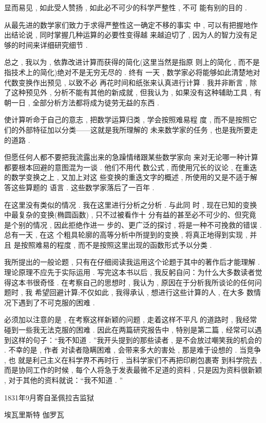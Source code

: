 显而易见 , 如此受人赞扬 , 如此必不可少的科学严整性 , 不可 能有别的目的 . 

从最先进的数学家们致力于求得严整性这一确定不移的事实 中 , 可以有把握地作出结论说 , 同时掌握几种运算的必要性变得越 来越迫切了 , 因为人的智力没有足够的时间来详细研究细节 . 

总之 , 我以为 , 依靠改进计算而获得的简化(这里当然是指原 则上的简化 , 而不是指技术上的简化)绝对不是无穷无尽的 . 终有 一天 , 数学家必将能够如此清楚地对代数变换作出预见 , 以致不必 再花时间和纸张来认真进行计算 . 我并非断言 , 除了这种预见外 ,  分析不能有其他的新成就 , 但我认为 , 如果没有这种辅助工具 , 有 朝一日 , 全部分析方法都将成为徒劳无益的东西 . 

使计算听命于自己的意志 , 把数学运算归类 , 学会按照难易程 度 , 而不是按照它们的外部特征加以分类——这就是我所理解的 未来数学家的任务 , 也是我所要走的道路 . 

但愿任何人都不要把我流露出来的急躁情绪跟某些数学家向 来对无论哪一种计算都要根本回避的意图混为一谈 . 他们不用代 数公式 , 而使用冗长的议论 , 在重迭的数学变换之上 , 又加上对这 些变换的重迭文字的概述 , 所使用的又是不适于解答这些算题的 语言 . 这些数学家落后了一百年 . 

在这里没有类似的情况 . 我在这里进行分析之分析 . 与此同 时 , 现在已知的变换中最复杂的变换(椭圆函数) , 只不过被看作十 分有益的甚至必不可少的、但究竟是个别的情况 , 因此拒绝作进一 步的、更广泛的探讨 , 将是一种不可挽救的错误 . 总有一天 , 在这 个粗具轮廓的高等分析中所提到的变换 , 将真正地得到实现 , 并且 是按照难易的程度 , 而不是按照这里出现的函数形式予以分类 . 

我所提出的一般论题 , 只有在仔细阅读我运用这个论题于其中的著作后才能理解 . 理论原理不应先于实际运用 . 写完这本书以后 , 我反躬自问：为什么大多数读者觉得这本书很奇怪 . 在考察自己的思想时 , 我认为 , 原因在于分析我所谈论的任何问题时 , 我 希望回避计算;不仅如此 , 我得承认 , 想进行这些计算的人 , 在大多 数情况下遇到了不可克服的困难 . 

必须加以注意的是 , 在考察这样新颖的问题 , 走着这样不平凡 的道路时 , 我经常碰到一些我无法克服的困难 . 因此在两篇研究报告中 , 特别是第二篇 , 经常可以遇到这样的句子：“我不知道 . ”我开头提到的那些读者 , 是不会放过嘲笑我的机会的 . 不幸的是 , 作者 对读者隐瞒困难 , 会带来多大的害处 , 那是难于设想的 . 当竞争 , 也 就是利己主义在科学界不再时行 , 当科学家们不再把印刷包裹寄 到科学院去 , 而是协同工作的时候 , 每个人将急于发表最微不足道的资料 , 只是因为资料很新颖 , 对于其他的资料就说：“我不知道 . ” 

\begin{flushright}
	1831年9月寄自圣佩拉吉监狱

埃瓦里斯特 \textbullet 伽罗瓦
\end{flushright}

